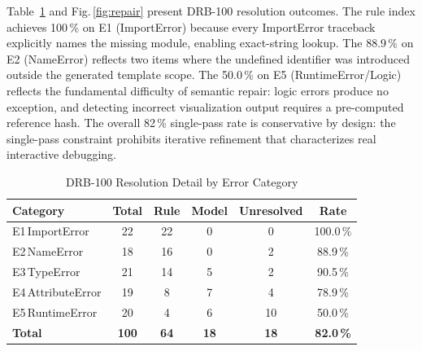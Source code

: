 \documentclass[conference]{IEEEtran}
\begin{document}
Table~\ref{tab:repair} and Fig.\,\ref{fig:repair} present DRB-100
resolution outcomes. The rule index achieves 100\,\% on E1 (ImportError)
because every ImportError traceback explicitly names the missing module,
enabling exact-string lookup. The 88.9\,\% on E2 (NameError) reflects
two items where the undefined identifier was introduced outside the
generated template scope. The 50.0\,\% on E5 (RuntimeError/Logic)
reflects the fundamental difficulty of semantic repair: logic errors
produce no exception, and detecting incorrect visualization output
requires a pre-computed reference hash. The overall 82\,\% single-pass
rate is conservative by design: the single-pass constraint prohibits
iterative refinement that characterizes real interactive debugging.

\begin{table}[t]
\centering
\caption{DRB-100 Resolution Detail by Error Category}
\label{tab:repair}
\renewcommand{\arraystretch}{1.1}
\setlength{\tabcolsep}{3pt}
\begin{tabular}{lccccc}
\toprule
\textbf{Category} & \textbf{Total} & \textbf{Rule}
                  & \textbf{Model} & \textbf{Unresolved}
                  & \textbf{Rate} \\
\midrule
E1\,ImportError    & 22 & 22 &  0 &  0 & 100.0\,\% \\
E2\,NameError      & 18 & 16 &  0 &  2 &  88.9\,\% \\
E3\,TypeError      & 21 & 14 &  5 &  2 &  90.5\,\% \\
E4\,AttributeError & 19 &  8 &  7 &  4 &  78.9\,\% \\
E5\,RuntimeError   & 20 &  4 &  6 & 10 &  50.0\,\% \\
\midrule
\textbf{Total} & \textbf{100} & \textbf{64} & \textbf{18}
               & \textbf{18}  & \textbf{82.0\,\%} \\
\bottomrule
\end{tabular}
\end{table}
\end{document}
